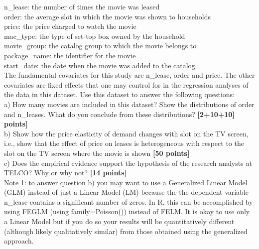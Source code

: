 \documentclass{article}
\begin{document}
n\_lease: the number of times the movie was leased\\

order: the average slot in which the movie was shown to households\\

price: the price charged to watch the movie\\

mac\_type: the type of set-top box owned by the household\\

movie\_group: the catalog group to which the movie belongs to\\

package\_name: the identifier for the movie\\

start\_date: the date when the movie was added to the catalog\\

The fundamental covariates for this study are n\_lease, order and price. The other covariates are fixed effects that one may control for in the regression analyses of the data in this dataset. Use this dataset to answer the following questions:\\

a) How many movies are included in this dataset? Show the distributions of order and n\_leases. What do you conclude from these distributions? {\bf [2+10+10] points]}\\

b) Show how the price elasticity of demand changes with slot on the TV screen, i.e., show that the effect of price on leases is heterogeneous with respect to the slot on the TV screen where the movie is shown {\bf [50 points]}\\

c) Does the empirical evidence support the hypothesis of the research analysts at TELCO? Why or why not? {\bf [14 points]}\\

Note 1: to answer question b) you may want to use a Generalized Linear Model (GLM) instead of just a Linear Model (LM) because the the dependent variable n\_lease contains a significant number of zeros. In R, this can be accomplished by using FEGLM (using family=Poisson()) instead of FELM. It is okay to use only a Linear Model but if you do so your results will be quantitatively different (although likely qualitatively similar) from those obtained using the generalized approach.\\
\end{document}
